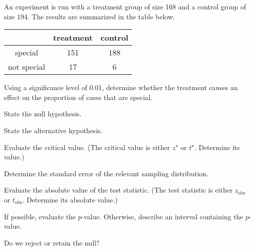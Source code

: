 
\begin{question}
An experiment is run with a treatment group of size 168 and a control
group of size 194. The results are summarized in the table below.

\begin{longtable}[]{@{}ccc@{}}
\toprule
& treatment & control\tabularnewline
\midrule
\endhead
special & 151 & 188\tabularnewline
not special & 17 & 6\tabularnewline
\bottomrule
\end{longtable}

Using a significance level of 0.01, determine whether the treatment
causes an effect on the proportion of cases that are special.
\begin{answerlist}
  \item State the null hypothesis.
  \item State the alternative hypothesis.
  \item Evaluate the critical value. (The critical value is either \(z^\star\)
or \(t^\star\). Determine its value.)
  \item Determine the standard error of the relevant sampling distribution.
  \item Evaluate the absolute value of the test statistic. (The test statistic
is either \(z_\text{obs}\) or \(t_\text{obs}\). Determine its absolute
value.)
  \item If possible, evaluate the \(p\)-value. Otherwise, describe an interval
containing the \(p\)-value.
  \item Do we reject or retain the null?
\end{answerlist}
\end{question}

